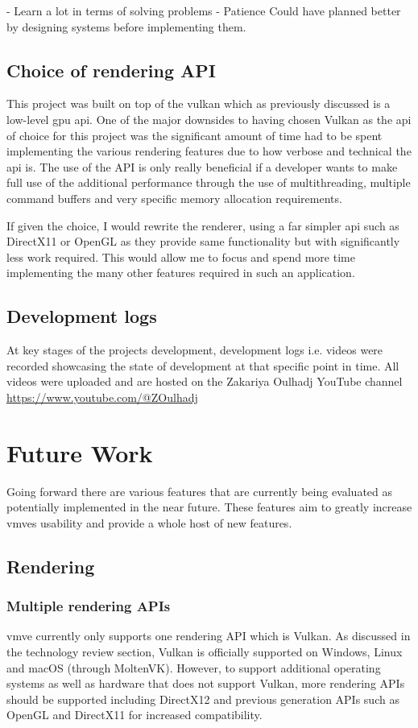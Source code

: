 \documentclass[11pt]{article}
\begin{document}
- Learn a lot in terms of solving problems
- Patience
Could have planned better by designing systems before implementing them.


\subsection{Choice of rendering API}
This project was built on top of the \gls{vulkan} which as previously discussed is a
low-level \gls{gpu} \gls{api}. One of the major downsides to having chosen Vulkan as
the \gls{api} of choice for this project was the significant amount of time had
to be spent implementing the various rendering features due to how verbose and
technical the \gls{api} is. The use of the API is only really beneficial if a
developer wants to make full use of the additional performance through the use
of multithreading, multiple command buffers and very specific memory allocation
requirements.

If given the choice, I would rewrite the renderer, using a far simpler \gls{api}
such as DirectX11 or OpenGL as they provide same functionality but with
significantly less work required. This would allow me to focus and spend more time 
implementing the many other features required in such an application.

\subsection{Development logs}
At key stages of the projects development, development logs i.e. videos were
recorded showcasing the state of development at that specific point in time. All
videos were uploaded and are hosted on the Zakariya Oulhadj YouTube channel
\url{https://www.youtube.com/@ZOulhadj}

\clearpage
\section{Future Work}
Going forward there are various features that are currently being evaluated as
potentially implemented in the near future. These features aim to greatly
increase \glspl{vmve} usability and provide a whole host of new features.

\subsection{Rendering}

\subsubsection{Multiple rendering APIs}
\gls{vmve} currently only supports one rendering API which is Vulkan. As
discussed in the technology review section, Vulkan is officially supported on
Windows, Linux and macOS (through MoltenVK). However, to support additional
operating systems as well as hardware that does not support Vulkan, more
rendering APIs should be supported including DirectX12 and previous generation
APIs such as OpenGL and DirectX11 for increased compatibility.
\end{document}
